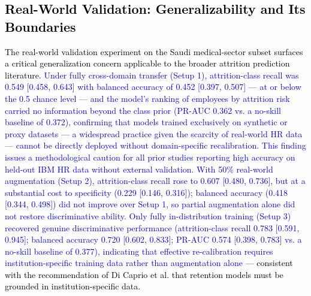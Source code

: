 \documentclass[a4paper,fleqn]{cas-sc}
\begin{document}
{\subsection{\textcolor{black}{Real-World Validation: Generalizability and Its Boundaries}}
\textcolor{black}{The real-world validation experiment on the Saudi medical-sector subset \cite{alqahtani2025saudi} surfaces a critical generalization concern applicable to the broader attrition prediction literature. \textcolor{blue}{Under fully cross-domain transfer (Setup 1), attrition-class recall was 0.549 [0.458, 0.643] with balanced accuracy of 0.452 [0.397, 0.507] — at or below the 0.5 chance level — and the model's ranking of employees by attrition risk carried no information beyond the class prior (PR-AUC 0.362 vs. a no-skill baseline of 0.372), confirming that models trained exclusively on synthetic or proxy datasets — a widespread practice given the scarcity of real-world HR data — cannot be directly deployed without domain-specific recalibration. This finding issues a methodological caution for all prior studies reporting high accuracy on held-out IBM HR data without external validation. With 50\% real-world augmentation (Setup 2), attrition-class recall rose to 0.607 [0.480, 0.736], but at a substantial cost to specificity (0.229 [0.146, 0.316]); balanced accuracy (0.418 [0.344, 0.498]) did not improve over Setup 1, so partial augmentation alone did not restore discriminative ability. Only fully in-distribution training (Setup 3) recovered genuine discriminative performance (attrition-class recall 0.783 [0.591, 0.945]; balanced accuracy 0.720 [0.602, 0.833]; PR-AUC 0.574 [0.398, 0.783] vs. a no-skill baseline of 0.377), indicating that effective re-calibration requires institution-specific training data rather than augmentation alone} — consistent with the recommendation of Di Caprio et al. \cite{DICAPRIO2025100403} that retention models must be grounded in institution-specific data.}

}
\end{document}
